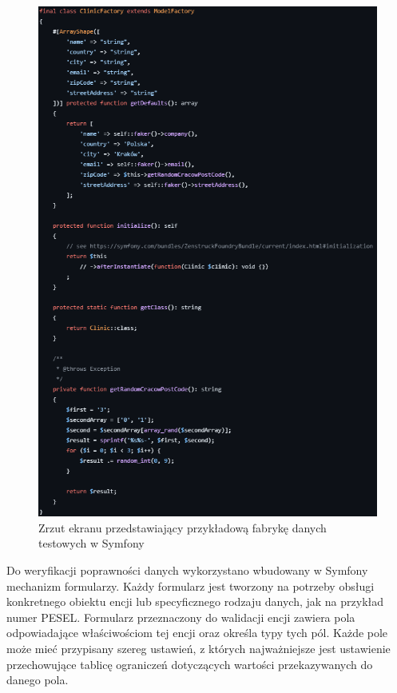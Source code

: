 \documentclass[12pt,twoside]{book}
\newcommand{\captionvspace}{\vspace{6pt}}
\begin{document}
    \begin{figure}[ht]
        \centering
        \includegraphics[width=\textwidth]{includes/images/example-fixtures-factory-before-migration.png}
        \captionvspace
        \caption{Zrzut ekranu przedstawiający przykładową fabrykę danych testowych w Symfony}
        \label{fig:example-sdiwpil-fixtures-factory}
    \end{figure}

    Do weryfikacji poprawności danych wykorzystano wbudowany w Symfony mechanizm formularzy. Każdy formularz jest tworzony na potrzeby obsługi konkretnego obiektu encji lub specyficznego rodzaju danych, jak na przykład numer PESEL. Formularz przeznaczony do walidacji encji zawiera pola odpowiadające właściwościom tej encji oraz określa typy tych pól. Każde pole może mieć przypisany szereg ustawień, z których najważniejsze jest ustawienie przechowujące tablicę ograniczeń dotyczących wartości przekazywanych do danego pola.
\end{document}
